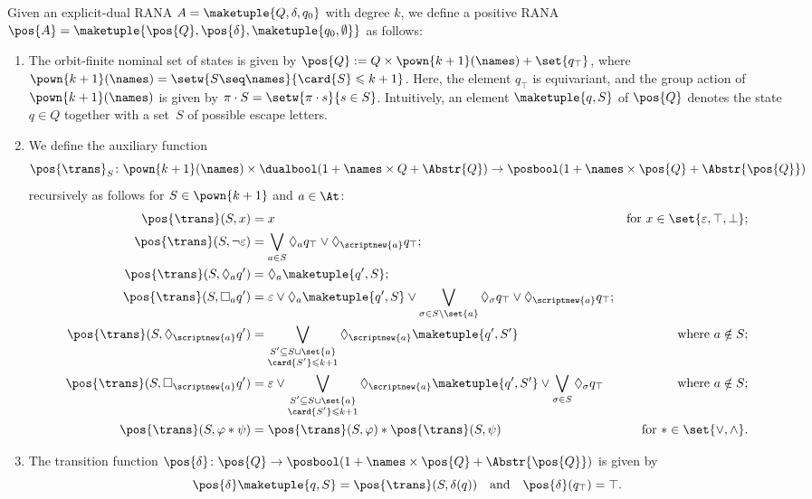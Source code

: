 \documentclass[10pt, final, conference, a4paper, twocolumn]{IEEEtran}
\begin{document}
\begin{construction}\label{constr:dual2pos}
    Given an explicit-dual RANA $A = \maketuple{Q, \delta, q_0}$ 
    with degree $k$, we define a positive RANA $\pos{A} = \maketuple{\pos{Q},\pos{\delta},\maketuple{q_0,\emptyset}}$ as follows:
    \begin{enumerate}
    \item The orbit-finite nominal set of states is given by
      $\pos{Q} := Q \times \pown{k + 1}(\names) + \set{q_{\top}}$,
      where
      $\pown{k + 1}(\names) = \setw{S \seq \names}{\card{S} \leqslant
        k + 1}$. Here, the element $q_{\top}$ is equivariant, and the
      group action of $\pown{k + 1}(\names)$ is given by
      $\pi\cdot S = \setw{\pi\cdot s}{s\in S}$. Intuitively, an
      element $\maketuple{q, S}$ of $\pos{Q}$ denotes the state
      $q \in Q$ together with a set~$S$ of possible escape letters.
        \item \label{posconstr:impl} We define the auxiliary function
          \[\pos{\trans}_S\colon \pown{k + 1}(\names) \times 
          \dualbool(1 + \names \times Q + \Abstr{Q}) \to \posbool(1 + \names 
          \times \pos{Q} + \Abstr{\pos{Q}})\] recursively
          as follows for $S \in \pown{k + 1}$ and $a\in \At$:
\begin{align*}
\pos{\trans}(S, x) &= x \quad & \text{for  $x \in \set{\varepsilon,\top,\bot}$};\\
\pos{\trans}(S, \neg{\varepsilon}) & = \bigvee_{a \in S} \Diamond_{a} q_{\top} \vee
          \Diamond_{\scriptnew{a}} q_{\top}; & \\
\pos{\trans}(S, \Diamond_a q')
          &= \Diamond_a \maketuple{q',S}; & \\
\pos{\trans}(S, \Box_a q') &= \varepsilon \vee \Diamond_a
          \maketuple{q',S} \vee  \bigvee_{\sigma \in S \setminus \set{a}} \Diamond_\sigma q_{\top} \vee
          \Diamond_{\scriptnew{a}} q_{\top}; & \\
\pos{\trans}(S, \Diamond_{\scriptnew{a}} q') &= \bigvee_{\substack{S' \subseteq
          S \cup \set{a}\\\card{S'} \leqslant k + 1}} \Diamond_{\scriptnew{a}}\maketuple{q',S'} & \text{where $a \notin S$};\\
\pos{\trans}(S, \Box_{\scriptnew{a}} q') &= \varepsilon \vee \bigvee_{\substack{S' \subseteq S
          \cup \set{a}\\\card{S'} \leqslant k + 1}} \Diamond_{\scriptnew{a}}\maketuple{q',S'} \vee
          \bigvee_{\sigma \in S} \Diamond_\sigma q_{\top} & \text{where $a \notin S$}; \\
\pos{\trans}(S, \varphi \ast \psi)
          & = \pos{\trans}(S, \varphi) \ast \pos{\trans}(S, \psi) & \text{for $\ast \in \set{\vee, \wedge}$}.
\end{align*}
        \item The transition function $\pos{\delta}\colon \pos{Q} \to \posbool(1 + \names \times
          \pos{Q} + \Abstr{\pos{Q}})$ is given by
          \[ \pos{\delta}\maketuple{q,S} = \pos{\trans}(S, \delta(q)) \quad\text{and}\quad \pos{\delta}({q_{\top}}) = \top.\]
    \end{enumerate}
\end{construction}
\end{document}
